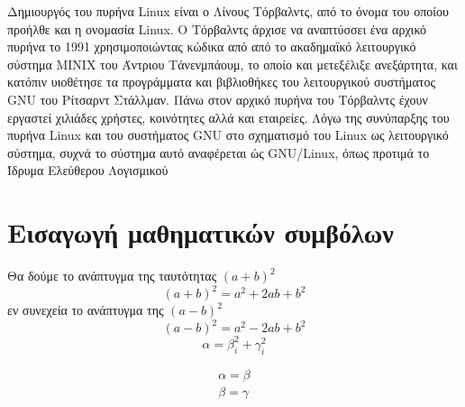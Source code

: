 \documentclass[a4paper,titlepage,oneside,12pt]{article}
\begin{document}
Δημιουργός του πυρήνα Linux είναι ο Λίνους Τόρβαλντς, από το όνομα του οποίου
προήλθε και η ονομασία Linux. O Τόρβαλντς άρχισε να αναπτύσσει ένα αρχικό πυρήνα το 1991
χρησιμοποιώντας κώδικα από από το ακαδημαϊκό λειτουργικό σύστημα MINIX του Άντριου 
Τάνενμπάουμ, το οποίο και μετεξέλιξε ανεξάρτητα, και κατόπιν υιοθέτησε τα προγράμματα και βιβλιοθήκες
του λειτουργικού συστήματος GNU του Ρίτσαρντ Στάλλμαν. Πάνω στον αρχικό πυρήνα του
Τόρβαλντς έχουν εργαστεί χιλιάδες χρήστες, κοινότητες αλλά και εταιρείες. Λόγω της
συνύπαρξης του πυρήνα Linux και του συστήματος GNU στο σχηματισμό του Linux ως 
λειτουργικό σύστημα, συχνά το σύστημα αυτό αναφέρεται ώς GNU/Linux, 
όπως προτιμά το Ίδρυμα Ελεύθερου 
Λογισμικού
 
\pagebreak
\section{Εισαγωγή μαθηματικών συμβόλων}
\parindent=0in
Θα δούμε το ανάπτυγμα της ταυτότητας $(a+b)^2$
\begin{equation}
(a+b)^2=a^2+2ab+b^2
\end{equation}
εν συνεχεία το ανάπτυγμα της $(a-b)^2$
\begin{equation}
(a-b)^2=a^2-2ab+b^2
\end{equation}
\begin{equation} 
    \alpha = \beta^2_i + \gamma^2_i 
\end{equation}
 
\begin{align} 
    \alpha = \beta\\
    \beta = \gamma
\end{align}
 
\end{document}

